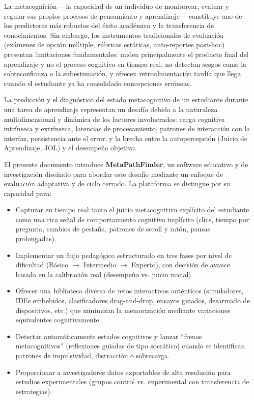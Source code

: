\documentclass[11pt,a4paper]{article}
\begin{document}
La metacognición ---la capacidad de un individuo de monitorear, evaluar y regular sus propios procesos de pensamiento y aprendizaje--- constituye uno de los predictores más robustos del éxito académico y la transferencia de conocimientos. Sin embargo, los instrumentos tradicionales de evaluación (exámenes de opción múltiple, rúbricas estáticas, auto-reportes post-hoc) presentan limitaciones fundamentales: miden principalmente el producto final del aprendizaje y no el proceso cognitivo en tiempo real, no detectan sesgos como la sobreconfianza o la subestimación, y ofrecen retroalimentación tardía que llega cuando el estudiante ya ha consolidado concepciones erróneas.

La predicción y el diagnóstico del estado metacognitivo de un estudiante durante una tarea de aprendizaje representan un desafío debido a la naturaleza multidimensional y dinámica de los factores involucrados: carga cognitiva intrínseca y extrínseca, latencias de procesamiento, patrones de interacción con la interfaz, persistencia ante el error, y la brecha entre la autopercepción (Juicio de Aprendizaje, JOL) y el desempeño objetivo.

El presente documento introduce \textbf{MetaPathFinder}, un software educativo y de investigación diseñado para abordar este desafío mediante un enfoque de evaluación adaptativa y de ciclo cerrado. La plataforma se distingue por su capacidad para:

\begin{itemize}[leftmargin=*]
    \item Capturar en tiempo real tanto el juicio metacognitivo explícito del estudiante como una rica señal de comportamiento cognitivo implícito (clics, tiempo por pregunta, cambios de pestaña, patrones de scroll y ratón, pausas prolongadas).
    \item Implementar un flujo pedagógico estructurado en tres fases por nivel de dificultad (Básico $\rightarrow$ Intermedio $\rightarrow$ Experto), con decisión de avance basada en la calibración real (desempeño vs. juicio inicial).
    \item Ofrecer una biblioteca diversa de retos interactivos auténticos (simuladores, IDEs embebidos, clasificadores drag-and-drop, ensayos guiados, desarmado de dispositivos, etc.) que minimizan la memorización mediante variaciones equivalentes cognitivamente.
    \item Detectar automáticamente estados cognitivos y lanzar ``frenos metacognitivos'' (reflexiones guiadas de tipo socrático) cuando se identifican patrones de impulsividad, distracción o sobrecarga.
    \item Proporcionar a investigadores datos exportables de alta resolución para estudios experimentales (grupos control vs. experimental con transferencia de estrategias).
\end{itemize}
\end{document}
